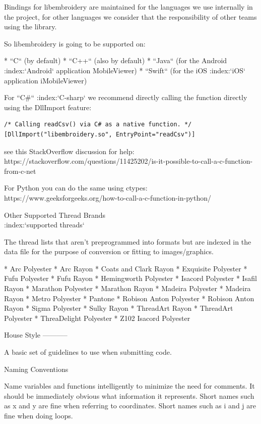 \documentclass[a4paper]{report}
\begin{document}
Bindings for libembroidery are maintained for the languages we use internally
in the project, for other languages we consider that the responsibility of
other teams using the library.

So libembroidery is going to be supported on:

* ``C`` (by default)
* ``C++`` (also by default)
* ``Java`` (for the Android :index:`Android` application MobileViewer)
* ``Swift`` (for the iOS :index:`iOS` application iMobileViewer)

For ``C\#`` :index:`C-sharp` we recommend directly calling the function directly
using the DllImport feature:

\begin{lstlisting}
/* Calling readCsv() via C# as a native function. */
[DllImport("libembroidery.so", EntryPoint="readCsv")]
\end{lstlisting}

see this StackOverflow discussion for help:
https://stackoverflow.com/questions/11425202/is-it-possible-to-call-a-c-function-from-c-net

For Python you can do the same using ctypes:
https://www.geeksforgeeks.org/how-to-call-a-c-function-in-python/

Other Supported Thread Brands
~~~~~~~~~~~~~~~~~~~~~~~~~~~~~
:index:`supported threads`

The thread lists that aren't preprogrammed into formats but are indexed in
the data file for the purpose of conversion or fitting to images/graphics.

* Arc Polyester
* Arc Rayon
* Coats and Clark Rayon
* Exquisite Polyester
* Fufu Polyester
* Fufu Rayon
* Hemingworth Polyester
* Isacord Polyester
* Isafil Rayon
* Marathon Polyester
* Marathon Rayon
* Madeira Polyester
* Madeira Rayon
* Metro Polyester
* Pantone
* Robison Anton Polyester
* Robison Anton Rayon
* Sigma Polyester
* Sulky Rayon
* ThreadArt Rayon
* ThreadArt Polyester
* ThreaDelight Polyester
* Z102 Isacord Polyester

House Style
-----------

A basic set of guidelines to use when submitting code.

Naming Conventions
~~~~~~~~~~~~~~~~~~

Name variables and functions intelligently to minimize the need for comments.
It should be immediately obvious what information it represents.
Short names such as x and y are fine when referring to coordinates.
Short names such as i and j are fine when doing loops.
\end{document}
